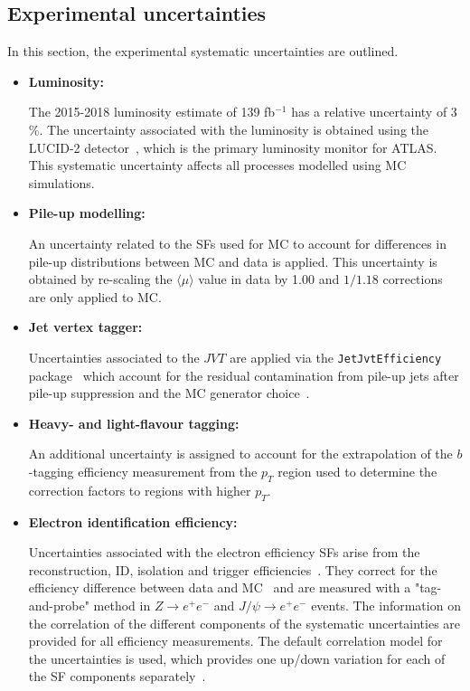\subsection{Experimental uncertainties}
\label{subsec:syst_exp}

In this section, the experimental systematic uncertainties are outlined.

\begin{itemize}
\item \textbf{Luminosity:}

The 2015-2018 luminosity estimate of 139 fb$^{-1}$ has a relative uncertainty of 3$\%$. The uncertainty associated with the luminosity is obtained using the LUCID-2 detector~\cite{Avoni:2018}, which is the primary luminosity monitor for ATLAS. This systematic uncertainty affects all processes modelled using MC simulations.


\item \textbf{Pile-up modelling:}

An uncertainty related to the SFs used for MC to account for differences in pile-up distributions between MC and data is applied. This uncertainty is obtained by re-scaling the $\langle \mu \rangle$ value in data by \num{1.00} and $1/1.18$ corrections are only applied to MC.


\item \textbf{Jet vertex tagger:}

Uncertainties associated to the $JVT$ are applied via the \texttt{JetJvtEfficiency} package~\cite{twiki-JVT} which account for the
residual contamination from pile-up jets after pile-up suppression and the MC generator choice~\cite{PERF-2016-06}.


\item \textbf{Heavy- and light-flavour tagging:}


An additional uncertainty is assigned to account for the extrapolation of the $b$-tagging efficiency measurement from the $p_{T}$ region used to determine the correction factors to regions with higher $p_{T}$.


\item \textbf{Electron identification efficiency:}

Uncertainties associated with the electron efficiency SFs arise from the reconstruction,
ID, isolation and trigger efficiencies~\cite{twiki-elSF}. They correct for the efficiency difference between data and MC~\cite{EGAM-2018-01}
and are measured with a "tag-and-probe" method in $Z\rightarrow e^{+}e^{-}$ and $J/\psi \rightarrow e^{+}e^{-}$ events. The information on the correlation of the different components of the systematic uncertainties are provided for all efficiency  measurements. The default correlation model for the uncertainties is used, which provides one up/down variation
for each of the SF components separately~\cite{twiki-elSF,twiki-elSFunc}.



\end{itemize}

